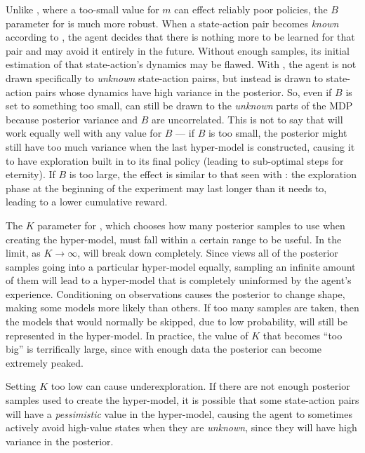 Unlike , where a too-small value for $m$ can effect reliably poor policies, the $B$ parameter for  is much more robust. When a state-action pair becomes \emph{known} according to , the agent decides that there is nothing more to be learned for that pair and may avoid it entirely in the future. Without enough samples, its initial estimation of that state-action's dynamics may be flawed. With , the agent is not drawn specifically to \emph{unknown} state-action pairss, but instead is drawn to state-action pairs whose dynamics have high variance in the posterior. So, even if $B$ is set to something too small,  can still be drawn to the \emph{unknown} parts of the MDP because posterior variance and $B$ are uncorrelated. This is not to say that  will work equally well with any value for $B$ --- if $B$ is too small, the posterior might still have too much variance when the last hyper-model is constructed, causing it to have exploration built in to its final policy (leading to sub-optimal steps for eternity). If $B$ is too large, the effect is similar to that seen with : the exploration phase at the beginning of the experiment may last longer than it needs to, leading to a lower cumulative reward.

The $K$ parameter for , which chooses how many posterior samples to use when creating the hyper-model, must fall within a certain range to be useful. In the limit, as $K\rightarrow\infty$,  will break down completely. Since  views all of the posterior samples going into a particular hyper-model equally, sampling an infinite amount of them will lead to a hyper-model that is completely uninformed by the agent's experience. Conditioning on observations causes the posterior to change shape, making some models more likely than others. If too many samples are taken, then the models that would normally be skipped, due to low probability, will still be represented in the hyper-model. In practice, the value of $K$ that becomes ``too big'' is terrifically large, since with enough data the posterior can become extremely peaked.

Setting $K$ too low can cause underexploration. If there are not enough posterior samples used to create the hyper-model, it is possible that some state-action pairs will have a \emph{pessimistic} value in the hyper-model, causing the agent to sometimes actively avoid high-value states when they are \emph{unknown}, since they will have high variance in the posterior.


